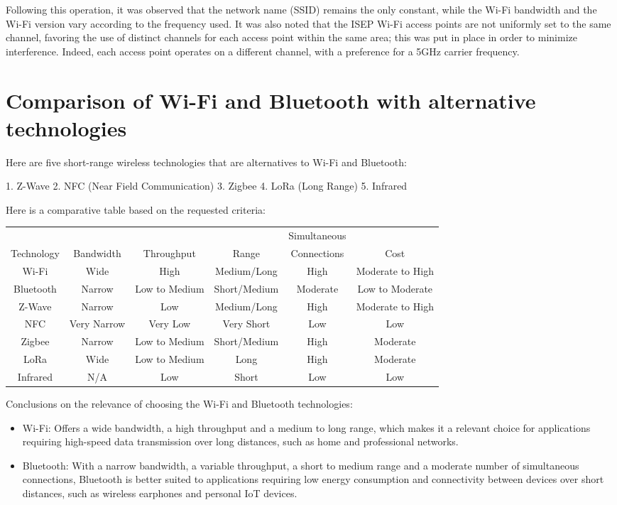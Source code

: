 \documentclass[12]{article}
\begin{document}
Following this operation, it was observed that the network name (SSID) remains the only constant, while the Wi-Fi bandwidth and the Wi-Fi version vary according to the frequency used. It was also noted that the ISEP Wi-Fi access points are not uniformly set to the same channel, favoring the use of distinct channels for each access point within the same area; this was put in place in order to minimize interference. Indeed, each access point operates on a different channel, with a preference for a 5GHz carrier frequency.




\section{Comparison of Wi-Fi and Bluetooth with alternative technologies}

Here are five short-range wireless technologies that are alternatives to Wi-Fi and Bluetooth:

1. Z-Wave
2. NFC (Near Field Communication)
3. Zigbee
4. LoRa (Long Range)
5. Infrared

Here is a comparative table based on the requested criteria:

\begin{center}
\begin{tabular}{|c|c|c|c|c|c|}
\hline
 &  &  &  & Simultaneous &  \\
Technology & Bandwidth & Throughput & Range & Connections & Cost \\
\hline
Wi-Fi & Wide & High & Medium/Long & High & Moderate to High \\
Bluetooth & Narrow & Low to Medium & Short/Medium & Moderate & Low to Moderate \\
Z-Wave & Narrow & Low & Medium/Long & High & Moderate to High \\
NFC & Very Narrow & Very Low & Very Short & Low & Low \\
Zigbee & Narrow & Low to Medium & Short/Medium & High & Moderate \\
LoRa & Wide & Low to Medium & Long & High & Moderate \\
Infrared & N/A & Low & Short & Low & Low \\
\hline
\end{tabular}
\end{center}


Conclusions on the relevance of choosing the Wi-Fi and Bluetooth technologies:
\begin{itemize}
    \item Wi-Fi: Offers a wide bandwidth, a high throughput and a medium to long range, which makes it a relevant choice for applications requiring high-speed data transmission over long distances, such as home and professional networks.
    \item Bluetooth: With a narrow bandwidth, a variable throughput, a short to medium range and a moderate number of simultaneous connections, Bluetooth is better suited to applications requiring low energy consumption and connectivity between devices over short distances, such as wireless earphones and personal IoT devices.
\end{itemize}
\end{document}

